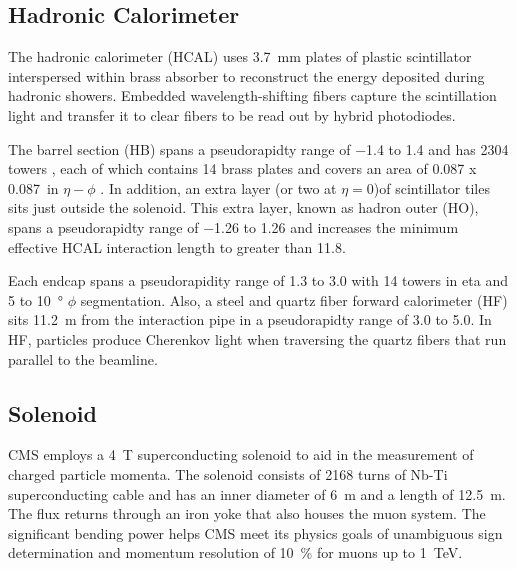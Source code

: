 \documentclass[12pt]{article}
\begin{document}
    \subsection{Hadronic Calorimeter}
        The hadronic calorimeter (HCAL) uses \SI{3.7}{mm} plates of plastic scintillator interspersed within brass absorber to reconstruct the energy deposited during hadronic showers. Embedded wavelength-shifting fibers capture the scintillation light and transfer it to clear fibers to be read out by hybrid photodiodes\cite{cms_experiment, cms_tdr}.

        The barrel section (HB) spans a pseudorapidty range of \num{-1.4} to \num{1.4} and has \num{2304} towers , each of which contains \num{14}  brass plates and covers an area of \num{0.087} x \SI{0.087}{in} $\eta-\phi$ . In addition, an extra layer (or two at $\eta = \num{0}$)of scintillator tiles sits just outside the solenoid. This extra layer, known as hadron outer (HO), spans a pseudorapidty range of \num{-1.26} to \num{1.26} and increases the minimum effective HCAL interaction length to greater than \num{11.8}.

        Each endcap spans a pseudorapidity range of \num{1.3} to \num{3.0} with \num{14} towers in eta and \num{5} to \SI{10}{\degree} $\phi$ segmentation. Also, a steel and quartz fiber forward calorimeter (HF) sits \SI{11.2}{m} from the interaction pipe in a pseudorapidty range of \num{3.0} to \num{5.0}. In HF, particles produce Cherenkov light when traversing the quartz fibers that run parallel to the beamline. 

    \subsection{Solenoid}
        CMS employs a \SI{4}{T} superconducting solenoid to aid in the measurement of charged particle momenta. The solenoid consists of \num{2168} turns of Nb-Ti superconducting cable and has an inner diameter of \SI{6}{m} and a length of \SI{12.5}{m}. The flux returns through an iron yoke that also houses the muon system. The significant  bending power helps CMS meet its physics goals of unambiguous sign determination and momentum resolution of \SI{10}{\percent} for muons up to \SI{1}{\tera\electronvolt}\cite{cms_experiment}.
\end{document}
